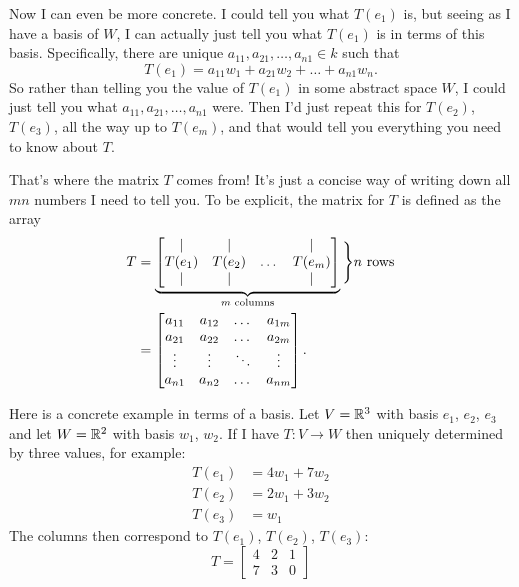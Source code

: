 Now I can even be more concrete.
I could tell you what $T(e_1)$ is, but seeing as I have a basis of $W$,
I can actually just tell you what $T(e_1)$ is in terms of this basis.
Specifically, there are unique $a_{11}, a_{21}, \dots, a_{n1} \in k$ such that
\[ T(e_1) = a_{11} w_1 + a_{21} w_2 + \dots + a_{n1} w_n. \]
So rather than telling you the value of $T(e_1)$ in some abstract space $W$,
I could just tell you what $a_{11}, a_{21}, \dots, a_{n1}$ were.
Then I'd just repeat this for $T(e_2)$, $T(e_3)$, all the way up to $T(e_m)$,
and that would tell you everything you need to know about $T$.

That's where the matrix $T$ comes from!
It's just a concise way of writing down all $mn$ numbers I need to tell you.
To be explicit, the matrix for $T$ is defined as the array
\begin{align*}
	T &= \underbrace{%
	\begin{bmatrix}
		\mid & \mid & & \mid \\
		T(e_1) & T(e_2) & \dots & T(e_{m}) \\
		\mid & \mid & & \mid \\
	\end{bmatrix}
	}_{\text{$m$ columns}} \Bigg\} \text{$n$ rows} \\
	&=
	\begin{bmatrix}
		a_{11} & a_{12} & \dots & a_{1m} \\
		a_{21} & a_{22} & \dots & a_{2m} \\
		\vdots & \vdots & \ddots & \vdots \\
		a_{n1} & a_{n2} & \dots & a_{nm}
	\end{bmatrix}.
\end{align*}

\begin{example}
	Here is a concrete example in terms of a basis.
	Let $V = \mathbb R^3$ with basis $e_1$, $e_2$, $e_3$
	and let $W = \mathbb R^2$ with basis $w_1$, $w_2$.
	If I have $T \colon V \to W$
	then uniquely determined by three values, for example:
	\begin{align*}
		T(e_1) &= 4w_1 + 7w_2 \\
		T(e_2) &= 2w_1 + 3w_2 \\
		T(e_3) &= w_1
	\end{align*}
	The columns then correspond to $T(e_1)$, $T(e_2)$, $T(e_3)$:
	\[
		T =
		\begin{bmatrix}
			4 & 2 & 1 \\
			7 & 3 & 0
		\end{bmatrix}
	\]
\end{example}

